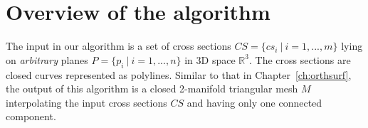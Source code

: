 



\section{Overview of the algorithm}
\label{ch6:sec:ov}

The input in our algorithm is a set  of cross sections
$CS=\{cs_i~|~i=1,...,m\}$ lying on \emph{arbitrary} planes
$P=\{p_i~|~i=1,...,n\}$ in 3D space $\mathbb{R}^3$. The cross
sections are closed curves represented as polylines. Similar to that
in Chapter~\ref{ch:orthsurf}, the output of this algorithm is  a
closed 2-manifold triangular mesh $M$ interpolating the input cross
sections $CS$ and having only one connected component.


